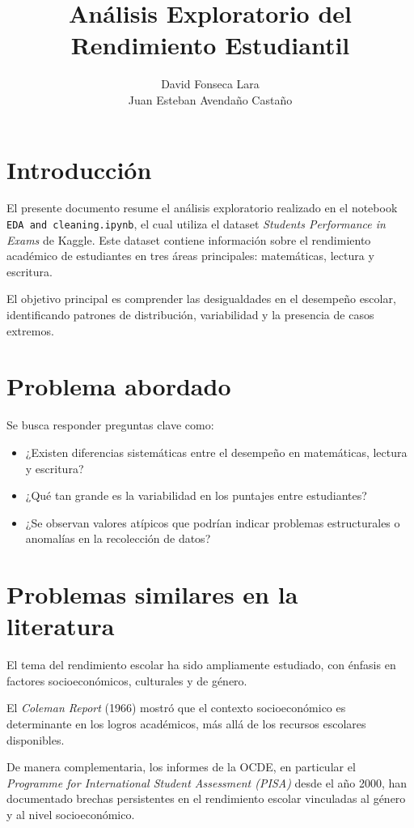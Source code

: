 \documentclass[12pt]{article}
\title{\textbf{Análisis Exploratorio del Rendimiento Estudiantil}}
\author{David Fonseca Lara \\ Juan Esteban Avendaño Castaño}
\date{}
\begin{document}
\maketitle

\section{Introducción}
El presente documento resume el análisis exploratorio realizado en el notebook 
\texttt{EDA and cleaning.ipynb}, el cual utiliza el dataset \textit{Students Performance in Exams} 
de Kaggle. Este dataset contiene información sobre el rendimiento académico de estudiantes en 
tres áreas principales: matemáticas, lectura y escritura.  

El objetivo principal es comprender las desigualdades en el desempeño escolar, 
identificando patrones de distribución, variabilidad y la presencia de casos extremos.

\section{Problema abordado}
Se busca responder preguntas clave como:
\begin{itemize}
    \item ¿Existen diferencias sistemáticas entre el desempeño en matemáticas, lectura y escritura?
    \item ¿Qué tan grande es la variabilidad en los puntajes entre estudiantes?
    \item ¿Se observan valores atípicos que podrían indicar problemas estructurales o anomalías en la recolección de datos?
\end{itemize}

\section{Problemas similares en la literatura}
El tema del rendimiento escolar ha sido ampliamente estudiado, con énfasis en factores socioeconómicos, 
culturales y de género.  

El \textit{Coleman Report} (1966) mostró que el contexto socioeconómico es determinante en los logros académicos, 
más allá de los recursos escolares disponibles.  

De manera complementaria, los informes de la OCDE, en particular el 
\textit{Programme for International Student Assessment (PISA)} desde el año 2000, han documentado brechas 
persistentes en el rendimiento escolar vinculadas al género y al nivel socioeconómico.  
\end{document}
